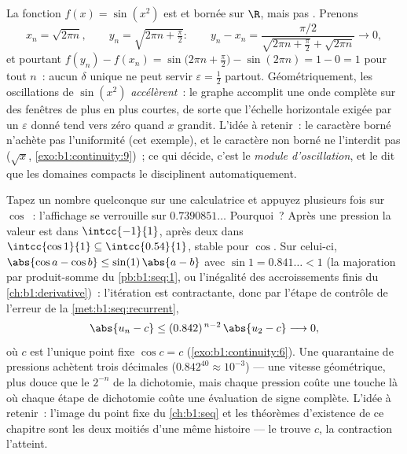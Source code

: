 \begin{example}\label{ex:b1:continuity:sinx2}
La fonction $f(x) = \sin(x^2)$ est  et bornée sur $\R$,
mais pas . Prenons
\[
x_n = \sqrt{2\pi n}, \qquad y_n = \sqrt{2\pi n + \tfrac\pi2}:
\qquad
y_n - x_n = \frac{\pi/2}{\sqrt{2\pi n + \frac\pi2} +
\sqrt{2\pi n}} \longrightarrow 0 ,
\]
et pourtant $f(y_n) - f(x_n) = \sin\bigl(2\pi n + \frac\pi2\bigr)
- \sin(2\pi n) = 1 - 0 = 1$ pour tout $n$~: aucun $\delta$ unique
ne peut servir $\varepsilon = \frac12$ partout. Géométriquement,
les oscillations de $\sin(x^2)$ \emph{accélèrent}~: le graphe
accomplit une onde complète sur des fenêtres de plus en plus
courtes, de sorte que l'échelle horizontale exigée par un
$\varepsilon$ donné tend vers zéro quand $x$ grandit. L'idée à
retenir~: le caractère borné n'achète pas l'uniformité (cet
exemple), et le caractère non borné ne l'interdit pas ($\sqrt x$,
\cref{exo:b1:continuity:9})~; ce qui décide, c'est le
\emph{module d'oscillation}, et le  dit que les
domaines compacts le disciplinent automatiquement.
\end{example}

\begin{example}\label{ex:b1:continuity:cositeration}
Tapez un nombre quelconque sur une calculatrice et appuyez
plusieurs fois sur $\cos$~: l'affichage se verrouille sur
$0.7390851\dots$ Pourquoi~? Après une pression la valeur est dans
$\intcc{-1}{1}$, après deux dans $\intcc{\cos 1}{1}
\subseteq \intcc{0.54}{1}$,  stable pour $\cos$. Sur
celui-ci, $\abs{\cos a - \cos b} \leq \sin(1)\,\abs{a - b}$ avec
$\sin 1 = 0.841\dots < 1$ (la majoration par produit-somme du
\cref{pb:b1:seq:1}, ou l'inégalité des accroissements finis du
\cref{ch:b1:derivative})~: l'itération est contractante, donc par
l'étape de contrôle de l'erreur de la \cref{met:b1:seq:recurrent},
\[
\abs{u_n - c} \leq (0.842)^{\,n-2}\,\abs{u_2 - c}
\longrightarrow 0 ,
\]
où $c$ est l'unique point fixe $\cos c = c$
(\cref{exo:b1:continuity:6}). Une quarantaine de pressions
achètent trois décimales ($0.842^{40} \approx 10^{-3}$) --- une
vitesse géométrique, plus douce que le $2^{-n}$ de la dichotomie,
mais chaque pression coûte une touche là où chaque étape de
dichotomie coûte une évaluation de signe complète. L'idée à
retenir~: l'image du point fixe du \cref{ch:b1:seq} et les
théorèmes d'existence de ce chapitre sont les deux moitiés d'une
même histoire --- le  trouve
$c$, la contraction l'atteint.
\end{example}


